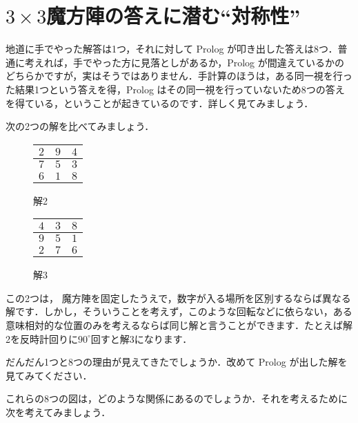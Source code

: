 \documentclass[11pt]{jsarticle}
\begin{document}
\section{$3\times 3$魔方陣の答えに潜む``対称性''}
地道に手でやった解答は1つ，それに対して Prolog が叩き出した答えは8つ．普通に考えれば，手でやった方に見落としがあるか，Prolog が間違えているかのどちらかですが，実はそうではありません．手計算のほうは，ある同一視を行った結果1つという答えを得，Prolog はその同一視を行っていないため8つの答えを得ている，ということが起きているのです．詳しく見てみましょう．

次の2つの解を比べてみましょう．
\begin{figure}[H]
    \captionsetup{labelformat=empty}
    \begin{minipage}{0.49\hsize}
    \centering
    \begin{tabular}{|c|c|c|}
      \hline
      $2$ & $9$ & $4$ \\ \hline
      $7$ & $5$ & $3$ \\ \hline
      $6$ & $1$ & $8$ \\ \hline
    \end{tabular}
    \caption{解2}
    \label{}
  \end{minipage}
  \begin{minipage}{0.49\hsize}
    \centering
    \begin{tabular}{|c|c|c|}
      \hline
      $4$ & $3$ & $8$ \\ \hline
      $9$ & $5$ & $1$ \\ \hline
      $2$ & $7$ & $6$ \\ \hline
    \end{tabular}
    \caption{解3}
    \label{}
  \end{minipage}
\end{figure}

この2つは，
魔方陣を固定したうえで，数字が入る場所を区別するならば異なる解です．しかし，そういうことを考えず，このような回転などに依らない，ある意味相対的な位置のみを考えるならば同じ解と言うことができます．たとえば解2を反時計回りに$90^\circ$回すと解3になります．

だんだん1つと8つの理由が見えてきたでしょうか．改めて Prolog が出した解を見てみてください．

これらの8つの図は，どのような関係にあるのでしょうか．それを考えるために次を考えてみましょう．
\end{document}
